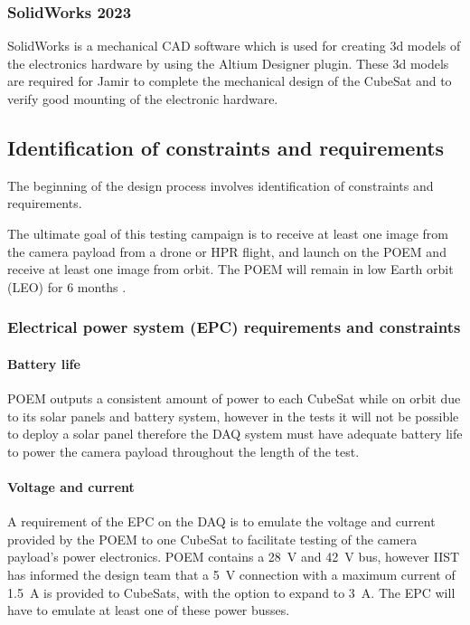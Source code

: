 \documentclass[a4paper,11pt]{article}
\begin{document}
\subsubsection{SolidWorks 2023}
SolidWorks is a mechanical CAD software which is used for creating 3d models of the electronics hardware by using the Altium Designer plugin. These 3d models are required for Jamir to complete the mechanical design of the CubeSat and to verify good mounting of the electronic hardware.


\subsection{Identification of constraints and requirements}
\label{sec:constraints-and-requirements}

The beginning of the design process involves identification of constraints and requirements.

The ultimate goal of this testing campaign is to receive at least one image from the camera payload from a drone or HPR flight, and launch on the POEM and receive at least one image from orbit. The POEM will remain in low Earth orbit (LEO) for 6 months \cite{jagdale2023sanket}.

\subsubsection{Electrical power system (EPC) requirements and constraints}
\paragraph{Battery life} POEM outputs a consistent amount of power to each CubeSat while on orbit due to its solar panels and battery system, however in the tests it will not be possible to deploy a solar panel therefore the DAQ system must have adequate battery life to power the camera payload throughout the length of the test.
\paragraph{Voltage and current} A requirement of the EPC on the DAQ is to emulate the voltage and current provided by the POEM to one CubeSat to facilitate testing of the camera payload's power electronics. POEM contains a \SI{28}{\volt} and \SI{42}{\volt} bus, however IIST has informed the design team that a \SI{5}{\volt} connection with a maximum current of \SI{1.5}{\ampere} is provided to CubeSats, with the option to expand to \SI{3}{\ampere}. The EPC will have to emulate at least one of these power busses.
\end{document}
